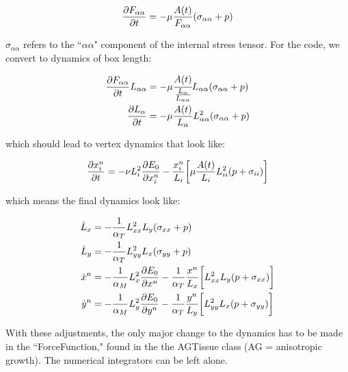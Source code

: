 \documentclass[12pt]{article}
\begin{document}
\begin{center}
\begin{equation}
\label{eqn: Fdyn}
\pdv{F_{\alpha\alpha}}{t} = -\mu \frac{A(t)}{F_{\alpha\alpha}} (\sigma_{\alpha\alpha} + p)
\end{equation}
\end{center}

$\sigma_{\alpha\alpha}$ refers to the ``$\alpha\alpha$" component of the internal stress tensor. For the code, we convert to dynamics of box length:
\begin{center}
\begin{equation}
\begin{split}
\pdv{F_{\alpha \alpha}}{t} L_{\alpha \alpha} &= -\mu \cfrac{A(t)}{\frac{L_\alpha}{L_{\alpha\alpha}}} L_{\alpha\alpha}(\sigma_{\alpha \alpha} + p) \\
\pdv{L_\alpha}{t} &= -\mu \frac{A(t)}{L_\alpha} L_{\alpha\alpha}^2 (\sigma_{\alpha\alpha} + p)
\end{split}
\end{equation}
\end{center}
which should lead to vertex dynamics that look like:
\begin{center}
\begin{equation}
\label{eqn: xdyn}
\pdv{x_i^n}{t} = -\nu L_i^2 \pdv{E_0}{x_i^n} - \frac{x_i^n}{L_i} \bigg[\mu \frac{A(t)}{L_i} L_{ii}^2(p + \sigma_{ii})\bigg]
\end{equation}
\end{center}
which means the final dynamics look like:
\begin{center}
\begin{equation}
\label{eqn: fullimplementdyn}
\begin{split}
\dot{L}_x &= -\frac{1}{\alpha_T} L_{xx}^2 L_y (\sigma_{xx} + p)\\
\dot{L}_y &= -\frac{1}{\alpha_T} L_{yy}^2 L_x (\sigma_{yy} + p)\\
\dot{x}^n &= -\frac{1}{\alpha_M} L_x^2 \pdv{E_0}{x^n} - \frac{1}{\alpha_T}\frac{x^n}{L_x} \bigg[ L_{xx}^2 L_y (p + \sigma_{xx})\bigg]\\
\dot{y}^n &= -\frac{1}{\alpha_M} L_y^2 \pdv{E_0}{y^n} - \frac{1}{\alpha_T}\frac{y^n}{L_y} \bigg[ L_{yy}^2 L_x (p + \sigma_{yy})\bigg]\\
\end{split}
\end{equation}
\end{center}

With these adjustments, the only major change to the dynamics has to be made in the ``ForceFunction," found in the the AGTissue class (AG = anisotropic growth). The numerical integrators can be left alone. 
\end{document}
